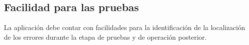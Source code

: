 \subsection{Facilidad para las pruebas}
La aplicaci\'on debe contar con facilidades para la identificaci\'on de la localizaci\'on de los errores durante la etapa de pruebas y de operaci\'on posterior.
